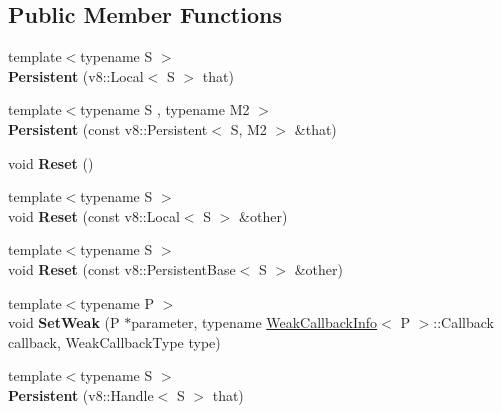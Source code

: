 \subsection*{Public Member Functions}
\begin{DoxyCompactItemize}
\item 
\mbox{\label{class_persistent_aaf57d86f82472fc5c8eb0514420cc03a}} 
{\footnotesize template$<$typename S $>$ }\\{\bfseries Persistent} (v8\+::\+Local$<$ S $>$ that)
\item 
\mbox{\label{class_persistent_a271958549bcf0322528004b26fc87399}} 
{\footnotesize template$<$typename S , typename M2 $>$ }\\{\bfseries Persistent} (const v8\+::\+Persistent$<$ S, M2 $>$ \&that)
\item 
\mbox{\label{class_persistent_a25e6e1023f5d86c241adecef829d476e}} 
void {\bfseries Reset} ()
\item 
\mbox{\label{class_persistent_ac1d92c61d83b9fecd834cc6c9f57982a}} 
{\footnotesize template$<$typename S $>$ }\\void {\bfseries Reset} (const v8\+::\+Local$<$ S $>$ \&other)
\item 
\mbox{\label{class_persistent_a13ac9c3ee42fa05d1dfc09b08e30283f}} 
{\footnotesize template$<$typename S $>$ }\\void {\bfseries Reset} (const v8\+::\+Persistent\+Base$<$ S $>$ \&other)
\item 
\mbox{\label{class_persistent_aa850986585a3d1841941e4bd2ad83d5c}} 
{\footnotesize template$<$typename P $>$ }\\void {\bfseries Set\+Weak} (P $\ast$parameter, typename \hyperlink{class_weak_callback_info}{Weak\+Callback\+Info}$<$ P $>$\+::Callback callback, Weak\+Callback\+Type type)
\item 
\mbox{\label{class_persistent_a2da9acd3f58f1c611ca348c35011a452}} 
{\footnotesize template$<$typename S $>$ }\\{\bfseries Persistent} (v8\+::\+Handle$<$ S $>$ that)
\item 
\mbox{\label{class_persistent_a44dbc7370f22232cdf406a4fed0da959}} 

\end{DoxyCompactItemize}
